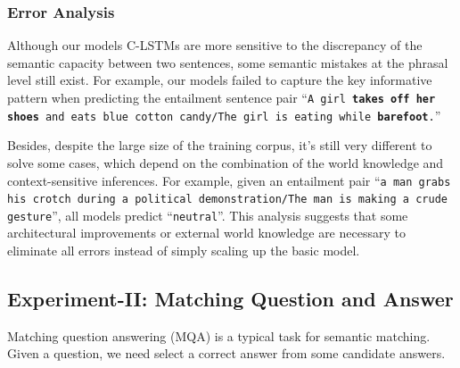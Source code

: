 \documentclass{article}
\begin{document}
%
%


\subsubsection{Error Analysis}
Although our models C-LSTMs are more sensitive to the discrepancy of the semantic capacity between two sentences, some semantic mistakes at the phrasal level still exist.
For example, our models failed to capture the key informative pattern when predicting the entailment sentence pair ``\texttt{A girl \textbf{takes off her shoes} and eats blue cotton candy/The girl is eating while \textbf{barefoot}.}''

Besides, despite the large size of the training corpus, it's still very different to solve some cases, which depend on the combination of the world knowledge and context-sensitive inferences.
For example, given an entailment pair ``\texttt{a man grabs his crotch during a political demonstration/The man is making a crude gesture}'', all models predict ``\texttt{neutral}''.
This analysis suggests that some architectural improvements or external world knowledge are necessary to eliminate all errors instead of simply scaling up the basic model.


\subsection{Experiment-II: Matching Question and Answer}
Matching question answering (MQA) is a typical task for semantic matching.
Given a question, we need select a correct answer from some candidate answers.
\end{document}
